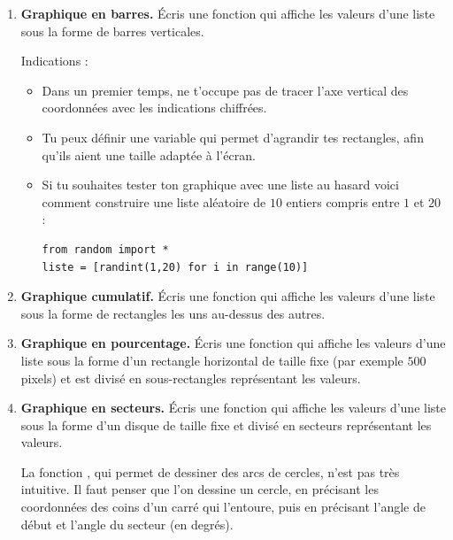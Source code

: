 \documentclass[11pt,class=report,crop=false]{standalone}
\begin{document}
\begin{activite}[Graphiques]
\begin{enumerate}
  \item \textbf{Graphique en barres.} Écris une fonction  qui affiche les valeurs d'une liste sous la forme de barres verticales.
  


 Indications :
  \begin{itemize}
    \item Dans un premier temps, ne t'occupe pas de tracer l'axe vertical des coordonnées avec les indications chiffrées.
    \item Tu peux définir une variable  qui permet d'agrandir tes rectangles, afin qu'ils aient une taille adaptée à l'écran.
    \item Si tu souhaites tester ton graphique avec une liste au hasard voici comment construire une liste aléatoire de $10$ entiers compris entre $1$ et $20$ :
    
\begin{lstlisting}
from random import *
liste = [randint(1,20) for i in range(10)]
\end{lstlisting}

\end{itemize}

  \item \textbf{Graphique cumulatif.} Écris une fonction  qui affiche les valeurs d'une liste sous la forme de rectangles les uns au-dessus des autres.
  

  
  \item \textbf{Graphique en pourcentage.} Écris une fonction  qui affiche les valeurs d'une liste sous la forme d'un rectangle horizontal de taille fixe (par exemple $500$ pixels) et est divisé en sous-rectangles représentant les valeurs.
  


  \item \textbf{Graphique en secteurs.} Écris une fonction  qui affiche les valeurs d'une liste sous la forme d'un disque de taille fixe et divisé en secteurs représentant les valeurs. 
 
La fonction , qui permet de dessiner des arcs de cercles, n'est pas très intuitive. Il faut penser que l'on dessine un cercle, en précisant les coordonnées des coins d'un carré qui l'entoure, puis en précisant l'angle de début et l'angle du secteur (en degrés). 



\end{enumerate}
\end{activite}
\end{document}
